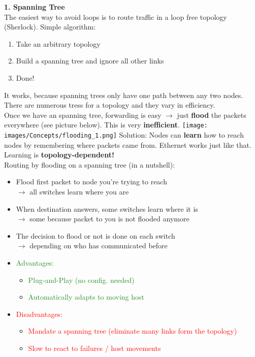\documentclass[a4paper, fontsize=8pt, landscape, DIV=1]{scrartcl}
\begin{document}
\begin{multicols*}{4}
			\textbf{1. Spanning Tree}\\
			The easiest way to avoid loops is to route traffic in a loop free topology (Sherlock). Simple algorithm: 
			\begin{enumerate}[noitemsep]
				\item Take an arbitrary topology
				\item Build a spanning tree and ignore all other links
				\item Done!
			\end{enumerate}
			It works, because spanning trees only have one path between any two nodes. There are numerous tress for a topology and they vary in efficiency. \\
			Once we have an spanning tree, forwarding is easy $\rightarrow$ just \textbf{flood} the packets everywhere (see picture below). This is very \textbf{inefficient}. 
			\texttt{[image: images/Concepts/flooding\_1.png]}
			Solution: Nodes can \textbf{learn} how to reach nodes by remembering where packets came from. Ethernet works just like that. Learning is \textbf{topology-dependent!}\\
			Routing by flooding on a spanning tree (in a nutshell):
			\begin{itemize}[noitemsep]
				\item Flood first packet to node you're trying to reach\\ $\rightarrow$ all switches learn where you are
				\item When destination answers, some switches learn where it is\\
				$\rightarrow$ some because packet to you is not flooded anymore
				\item The decision to flood or not is done on each switch\\ $\rightarrow$ depending on who has communicated before 
			\end{itemize}
			\begin{itemize}[noitemsep]
				\item \textcolor{ForestGreen}{Advantages:}
				\begin{itemize}
					\item \textcolor{ForestGreen}{Plug-and-Play (no config. needed)} 
					\item \textcolor{ForestGreen}{Automatically adapts to moving host}
				\end{itemize}
				\item \textcolor{red}{Disadvantages:}
				\begin{itemize}
					\item \textcolor{red}{Mandate a spanning tree (eliminate many links form the topology)}
					\item \textcolor{red}{Slow to react to failures / host movements}
				\end{itemize} 
			\end{itemize}
			

\end{multicols*}
\end{document}
